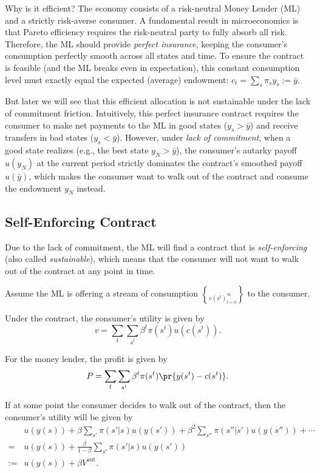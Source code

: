 Why is it efficient? The economy consists of a risk-neutral Money Lender (ML) and a strictly risk-averse consumer. A fundamental result in microeconomics is that Pareto efficiency requires the risk-neutral party to fully absorb all risk. Therefore, the ML should provide \textit{perfect insurance}, keeping the consumer's consumption perfectly smooth across all states and time. To ensure the contract is feasible (and the ML breaks even in expectation), this constant consumption level must exactly equal the expected (average) endowment: $c_t = \sum_s \pi_s y_s := \bar{y}$.
    
But later we will see that this efficient allocation is not sustainable under the lack of commitment friction. Intuitively, this perfect insurance contract requires the consumer to make net payments to the ML in good states ($y_s > \bar{y}$) and receive transfers in bad states ($y_s < \bar{y}$). However, under \textit{lack of commitment}, when a good state realizes (e.g., the best state $y_N > \bar{y}$), the consumer's autarky payoff $u(y_N)$ at the current period strictly dominates the contract's smoothed payoff $u(\bar{y})$, which makes the consumer want to walk out of the contract and consume the endowment $y_N$ instead.

\subsection{Self-Enforcing Contract}

Due to the lack of commitment, the ML will find a contract that is \textit{self-enforcing} (also called \textit{sustainable}), which means that the consumer will not want to walk out of the contract at any point in time.

Assume the ML is offering a stream of consumption $\brace{c(s^t)}_{t=0}^\infty$ to the consumer.

Under the contract, the consumer's utility is given by
\[
v = \sum_t\sum_{s^t}\beta^t \pi(s^t) u(c(s^t)).
\]

For the money lender, the profit is given by
\[
P = \sum_t\sum_{s^t}\beta^t\pi(s^t)\pr{y(s^t) - c(s^t)}.
\]

If at some point the consumer decides to walk out of the contract, then the consumer's utility will be given by
\[
\begin{aligned}
    & u(y(s))+\beta \sum_{s'}\pi(s'|s)u(y(s')) + \beta^2 \sum_{s''}\pi(s''|s')u(y(s'')) + \cdots\\
    = & u(y(s)) + \frac{\beta}{1-\beta} \sum_{s'}\pi(s'|s)u(y(s')) \\
    := & u(y(s))+\beta V^{\text{aut}}.
\end{aligned}
\]

